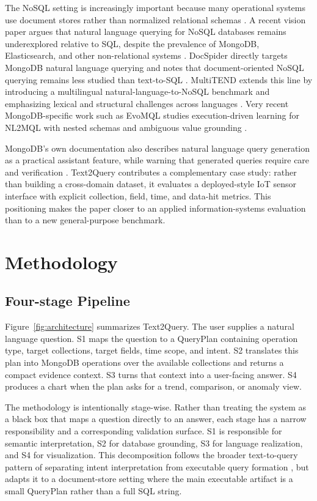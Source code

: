 \documentclass[11pt]{article}
\begin{document}
The NoSQL setting is increasingly important because many operational systems use document stores rather than normalized relational schemas \cite{davoudian2018nosql}. A recent vision paper argues that natural language querying for NoSQL databases remains underexplored relative to SQL, despite the prevalence of MongoDB, Elasticsearch, and other non-relational systems \cite{zhang2024nosqlvision}. DocSpider directly targets MongoDB natural language querying and notes that document-oriented NoSQL querying remains less studied than text-to-SQL \cite{ozer2025docspider}. MultiTEND extends this line by introducing a multilingual natural-language-to-NoSQL benchmark and emphasizing lexical and structural challenges across languages \cite{qin2025multitend}. Very recent MongoDB-specific work such as EvoMQL studies execution-driven learning for NL2MQL with nested schemas and ambiguous value grounding \cite{ye2026evomql}.

MongoDB's own documentation also describes natural language query generation as a practical assistant feature, while warning that generated queries require care and verification \cite{mongodb2026natural}. Text2Query contributes a complementary case study: rather than building a cross-domain dataset, it evaluates a deployed-style IoT sensor interface with explicit collection, field, time, and data-hit metrics. This positioning makes the paper closer to an applied information-systems evaluation than to a new general-purpose benchmark.

\section{Methodology}

\subsection{Four-stage Pipeline}

Figure~\ref{fig:architecture} summarizes Text2Query. The user supplies a natural language question. S1 maps the question to a QueryPlan containing operation type, target collections, target fields, time scope, and intent. S2 translates this plan into MongoDB operations over the available collections and returns a compact evidence context. S3 turns that context into a user-facing answer. S4 produces a chart when the plan asks for a trend, comparison, or anomaly view.

The methodology is intentionally stage-wise. Rather than treating the system as a black box that maps a question directly to an answer, each stage has a narrow responsibility and a corresponding validation surface. S1 is responsible for semantic interpretation, S2 for database grounding, S3 for language realization, and S4 for visualization. This decomposition follows the broader text-to-query pattern of separating intent interpretation from executable query formation \cite{guo2019irnet,scholak2021picard}, but adapts it to a document-store setting where the main executable artifact is a small QueryPlan rather than a full SQL string.
\end{document}
